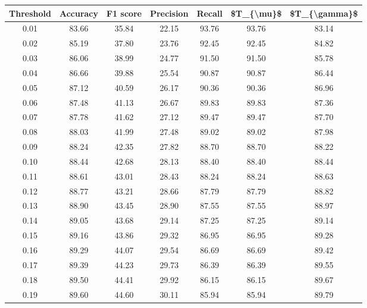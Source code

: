 \begin{tabular}{|c|c|c|c|c|c|c|}
\hline
 Threshold &  Accuracy &  F1 score &  Precision &  Recall &  \$T\_\{\textbackslash mu\}\$ &  \$T\_\{\textbackslash gamma\}\$ \\
\hline
      0.01 &     83.66 &     35.84 &      22.15 &   93.76 &      93.76 &         83.14 \\
      0.02 &     85.19 &     37.80 &      23.76 &   92.45 &      92.45 &         84.82 \\
      0.03 &     86.06 &     38.99 &      24.77 &   91.50 &      91.50 &         85.78 \\
      0.04 &     86.66 &     39.88 &      25.54 &   90.87 &      90.87 &         86.44 \\
      0.05 &     87.12 &     40.59 &      26.17 &   90.36 &      90.36 &         86.96 \\
      0.06 &     87.48 &     41.13 &      26.67 &   89.83 &      89.83 &         87.36 \\
      0.07 &     87.78 &     41.62 &      27.12 &   89.47 &      89.47 &         87.70 \\
      0.08 &     88.03 &     41.99 &      27.48 &   89.02 &      89.02 &         87.98 \\
      0.09 &     88.24 &     42.35 &      27.82 &   88.70 &      88.70 &         88.22 \\
      0.10 &     88.44 &     42.68 &      28.13 &   88.40 &      88.40 &         88.44 \\
      0.11 &     88.61 &     43.01 &      28.43 &   88.24 &      88.24 &         88.63 \\
      0.12 &     88.77 &     43.21 &      28.66 &   87.79 &      87.79 &         88.82 \\
      0.13 &     88.90 &     43.45 &      28.90 &   87.55 &      87.55 &         88.97 \\
      0.14 &     89.05 &     43.68 &      29.14 &   87.25 &      87.25 &         89.14 \\
      0.15 &     89.16 &     43.86 &      29.32 &   86.95 &      86.95 &         89.28 \\
      0.16 &     89.29 &     44.07 &      29.54 &   86.69 &      86.69 &         89.42 \\
      0.17 &     89.39 &     44.23 &      29.73 &   86.39 &      86.39 &         89.55 \\
      0.18 &     89.50 &     44.41 &      29.92 &   86.15 &      86.15 &         89.67 \\
      0.19 &     89.60 &     44.60 &      30.11 &   85.94 &      85.94 &         89.79 \\

\end{tabular}

